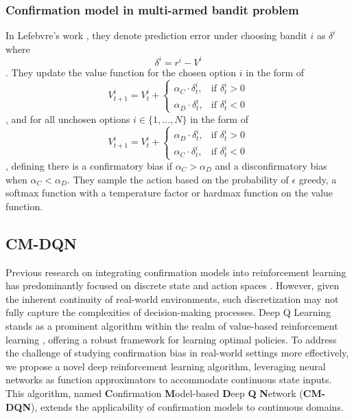 \documentclass[10pt,letterpaper]{article}
\begin{document}
\subsubsection{Confirmation model in multi-armed bandit problem}
In Lefebvre's work \cite{lefebvre2022normative}, they denote prediction error under choosing bandit $i$ as $\delta^i$ where \begin{equation}
    \delta^i = r^i - V^i
\end{equation}. They update the value function for the chosen option $i$ in the form of \begin{equation}
    V_{t+1}^{i} = V_{t}^{i} + 
\begin{cases}
    \alpha_C \cdot \delta_{t}^{i}, & \text{if } \delta_{t}^{i} > 0 \\
    \alpha_D \cdot \delta_{t}^{i}, & \text{if } \delta_{t}^{i} < 0
\end{cases}
\end{equation}, and for all unchosen options $i \in \{1,\dots,N\}$ in the form of \begin{equation}
    V_{t+1}^{i} = V_{t}^{i} + 
\begin{cases}
    \alpha_D \cdot \delta_{t}^{i}, & \text{if } \delta_{t}^{i} > 0 \\
    \alpha_C \cdot \delta_{t}^{i}, & \text{if } \delta_{t}^{i} < 0
\end{cases}
\end{equation}, defining there is a confirmatory bias if $\alpha_C > \alpha_D$ and a disconfirmatory bias when $\alpha_C < \alpha_D$. They sample the action based on the probability of $\epsilon$ greedy, a softmax function with a temperature factor or hardmax function on the value function.

\subsection{CM-DQN}
Previous research on integrating confirmation models into reinforcement learning has predominantly focused on discrete state and action spaces \cite{palminteri2023choice}. However, given the inherent continuity of real-world environments, such discretization may not fully capture the complexities of decision-making processes. Deep Q Learning stands as a prominent algorithm within the realm of value-based reinforcement learning \cite{hester2018deep}, offering a robust framework for learning optimal policies. To address the challenge of studying confirmation bias in real-world settings more effectively, we propose a novel deep reinforcement learning algorithm, leveraging neural networks as function approximators to accommodate continuous state inputs. This algorithm, named \textbf{C}onfirmation \textbf{M}odel-based \textbf{D}eep \textbf{Q} \textbf{N}etwork (\textbf{CM-DQN}), extends the applicability of confirmation models to continuous domains.
\end{document}

